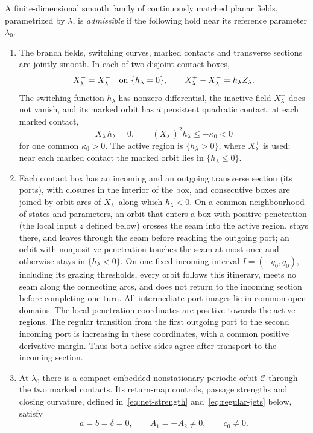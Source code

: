 \begin{definition}\label{def:admissible-family}
A finite-dimensional smooth family of continuously matched planar fields,
parametrized by $\lambda$, is \emph{admissible} if the following hold near
its reference parameter $\lambda_0$.
\begin{enumerate}
\item The branch fields, switching curves, marked contacts and transverse
sections are jointly smooth. In each of two disjoint contact boxes,
\begin{equation}\label{eq:matched}
 X^+_\lambda=X^-_\lambda\quad\hbox{on }\{h_\lambda=0\},
 \qquad X^+_\lambda-X^-_\lambda=h_\lambda Z_\lambda.
\end{equation}
The switching function $h_\lambda$ has nonzero differential, the inactive
field $X^-_\lambda$ does not vanish, and its marked orbit has a persistent
quadratic contact: at each marked contact,
\[
 X^-_\lambda h_\lambda=0,\qquad
 (X^-_\lambda)^2h_\lambda\le-\kappa_0<0
\]
for one common $\kappa_0>0$. The active region is $\{h_\lambda>0\}$, where
$X^+_\lambda$ is used; near each marked contact the marked orbit lies in
$\{h_\lambda\le0\}$.

\item Each contact box has an incoming and an outgoing transverse section
(its ports), with closures in the interior of the box, and consecutive boxes
are joined by orbit arcs of $X^-_\lambda$ along which $h_\lambda<0$. On a
common neighbourhood of states and parameters, an orbit that enters a box with
positive penetration (the local input $z$ defined below) crosses the seam into
the active region, stays there, and leaves through the seam before reaching
the outgoing port; an orbit with nonpositive penetration touches the seam at
most once and otherwise stays in $\{h_\lambda<0\}$. On one fixed incoming
interval $I=(-q_0,q_0)$, including its grazing thresholds, every orbit follows
this itinerary, meets no seam along the connecting arcs, and does not return
to the incoming section before completing one turn. All intermediate port
images lie in common open domains.
The local penetration coordinates are positive towards the active regions.
The regular transition from the first outgoing port to the second incoming
port is increasing in these coordinates, with a common positive derivative
margin. Thus both active sides agree after transport to the incoming section.
\item At $\lambda_0$ there is a compact embedded nonstationary periodic orbit
$\mathcal C$ through the two marked contacts. Its return-map controls, passage
strengths and closing curvature, defined in~\eqref{eq:net-strength}
and~\eqref{eq:regular-jets} below, satisfy
\[
 a=b=\delta=0,\qquad A_1=-A_2\ne0,\qquad c_0\ne0.
\]
\end{enumerate}
\end{definition}

